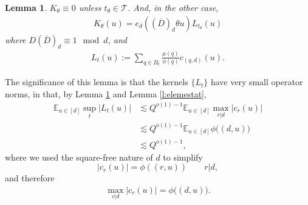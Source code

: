 \documentclass[12pt]{amsart}
\numberwithin{equation}{section}
\newtheorem{lemma}[theorem]{Lemma}
\theoremstyle{definition}
\begin{document}
\begin{lemma}\label{l:periodicfiber}
   $K_\theta \equiv 0$ unless $t_\theta \in \mathcal{T}$. And, in the other case,
   \begin{align}
   K_\theta(u) = e_d( (\overline{D})_d \theta u) L_{t_\theta}(u)
\end{align}
where $D (\overline{D})_d \equiv 1 \mod d$,
and
\begin{align}
    L_t(u) := \sum_{q \in B_t} \frac{\mu(q)}{\phi(q)} c_{(q,d)}(u).
\end{align}
\end{lemma}
The significance of this lemma is that the kernels $\{ L_t \}$ have very small operator norms, in that, by Lemma \ref{l:periodicfiber} and Lemma \ref{l:elemestat}, 
\begin{align}\label{e:supLest}
    \mathbb{E}_{u \in [d]} \sup_t  |L_t(u)| &\lesssim Q^{o(1)-1 } \mathbb{E}_{u \in [d]} \max_{r | d} |c_r(u)| \\
    & \lesssim Q^{o(1)-1} \mathbb{E}_{u \in [d]} \phi\big((d,u)\big) \\
    &\lesssim Q^{o(1) -1},
\end{align}
where we used the square-free nature of $d$ to simplify
\[ |c_r(u)|=\phi((r,u)) \qquad r|d,\]
and therefore
\begin{align}
    \max_{r|d}|c_r(u)|=\phi\big((d,u) \big).
\end{align}
\end{document}
